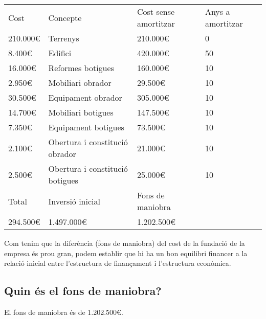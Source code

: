 \begin{tabular}{| l | p{4cm} | p{2cm} | p{2cm} |}
  \hline
  Cost & Concepte & Cost sense amortitzar & Anys a amortitzar \\
  210.000€ & Terrenys & 210.000€ & 0 \\
  8.400€ & Edifici & 420.000€ & 50 \\
  16.000€ & Reformes botigues & 160.000€ & 10 \\
  2.950€ & Mobiliari obrador & 29.500€ & 10 \\
  30.500€ & Equipament obrador & 305.000€ & 10 \\
  14.700€ & Mobiliari botigues & 147.500€ & 10 \\
  7.350€ & Equipament botigues & 73.500€ & 10 \\
  2.100€ & Obertura i constitució obrador & 21.000€ & 10 \\
  2.500€ & Obertura i constitució botigues & 25.000€ & 10 \\
  Total & Inversió inicial & Fons de maniobra & \\
  294.500€ & 1.497.000€ & 1.202.500€ & \\
  \hline
\end{tabular}

Com tenim que la diferència (fons de maniobra) del cost de la fundació de la
empresa és prou gran, podem establir que hi ha un bon equilibri financer a la
relació inicial entre l’estructura de finançament i l’estructura econòmica.

\subsection{Quin és el fons de maniobra?}

El fons de maniobra és de 1.202.500€.
